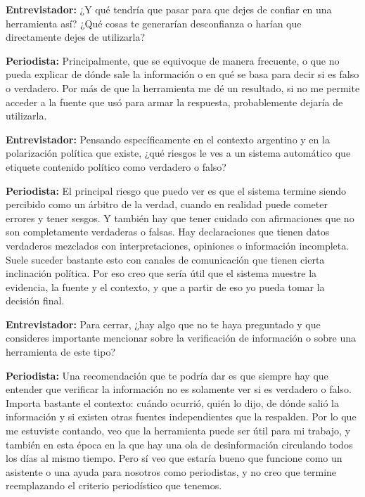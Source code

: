 \medskip

\noindent\textbf{Entrevistador:} ¿Y qué tendría que pasar para que dejes de confiar en una herramienta así? ¿Qué cosas te generarían desconfianza o harían que directamente dejes de utilizarla?

\noindent\textbf{Periodista:} Principalmente, que se equivoque de manera frecuente, o que no pueda explicar de dónde sale la información o en qué se basa para decir si es falso o verdadero. Por más de que la herramienta me dé un resultado, si no me permite acceder a la fuente que usó para armar la respuesta, probablemente dejaría de utilizarla.

\medskip

\noindent\textbf{Entrevistador:} Pensando específicamente en el contexto argentino y en la polarización política que existe, ¿qué riesgos le ves a un sistema automático que etiquete contenido político como verdadero o falso?

\noindent\textbf{Periodista:} El principal riesgo que puedo ver es que el sistema termine siendo percibido como un árbitro de la verdad, cuando en realidad puede cometer errores y tener sesgos. Y también hay que tener cuidado con afirmaciones que no son completamente verdaderas o falsas. Hay declaraciones que tienen datos verdaderos mezclados con interpretaciones, opiniones o información incompleta. Suele suceder bastante esto con canales de comunicación que tienen cierta inclinación política. Por eso creo que sería útil que el sistema muestre la evidencia, la fuente y el contexto, y que a partir de eso yo pueda tomar la decisión final.

\medskip

\noindent\textbf{Entrevistador:} Para cerrar, ¿hay algo que no te haya preguntado y que consideres importante mencionar sobre la verificación de información o sobre una herramienta de este tipo?

\noindent\textbf{Periodista:} Una recomendación que te podría dar es que siempre hay que entender que verificar la información no es solamente ver si es verdadero o falso. Importa bastante el contexto: cuándo ocurrió, quién lo dijo, de dónde salió la información y si existen otras fuentes independientes que la respalden. Por lo que me estuviste contando, veo que la herramienta puede ser útil para mi trabajo, y también en esta época en la que hay una ola de desinformación circulando todos los días al mismo tiempo. Pero sí veo que estaría bueno que funcione como un asistente o una ayuda para nosotros como periodistas, y no creo que termine reemplazando el criterio periodístico que tenemos.
